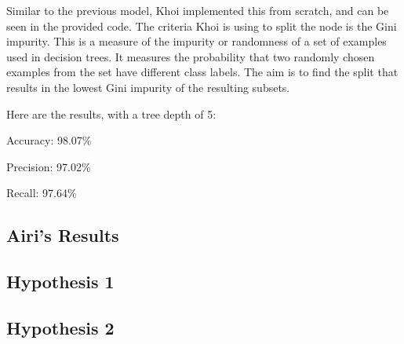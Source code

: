 Similar to the previous model, Khoi implemented this from scratch, and can be seen in the provided code. The criteria Khoi is using to split the node is the Gini impurity. This is a measure of the impurity or randomness of a set of examples used in decision trees. It measures the probability that two randomly chosen examples from the set have different class labels. The aim is to find the split that results in the lowest Gini impurity of the resulting subsets.

Here are the results, with a tree depth of 5:

Accuracy: 98.07\%

Precision: 97.02\%

Recall: 97.64\%

\subsection{Airi's Results}

\subsection{Hypothesis 1}

\subsection{Hypothesis 2}
